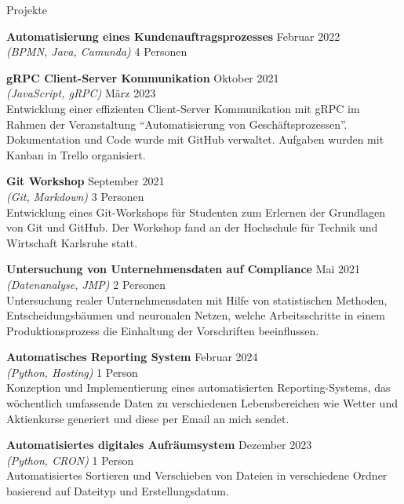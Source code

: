 \documentclass{resume} %
\begin{document}
\begin{rSection}{Projekte}
    \item \textbf{Automatisierung eines Kundenauftragsprozesses} \hfill {Februar 2022} \\
    \textit{(BPMN, Java, Camunda)} \hfill {4 Personen}\\

    \item \textbf{gRPC Client-Server Kommunikation} \hfill {Oktober 2021} \\
    \textit{(JavaScript, gRPC)} \hfill {März 2023}\\
    {Entwicklung einer effizienten Client-Server Kommunikation mit gRPC im Rahmen der Veranstaltung “Automatisierung von Geschäftsprozessen”.
    Dokumentation und Code wurde mit GitHub verwaltet. Aufgaben wurden mit Kanban in Trello organisiert.}
    
    \item \textbf{Git Workshop} \hfill {September 2021} \\
    \textit{(Git, Markdown)} \hfill {3 Personen}\\
    {Entwicklung eines Git-Workshops für Studenten zum Erlernen der Grundlagen von Git und GitHub.
    Der Workshop fand an der Hochschule für Technik und Wirtschaft Karlsruhe statt.}

    \item \textbf{Untersuchung von Unternehmensdaten auf Compliance} \hfill {Mai 2021} \\
    \textit{(Datenanalyse, JMP)} \hfill {2 Personen} \\
    {Untersuchung realer Unternehmensdaten mit Hilfe von statistischen Methoden, Entscheidungsbäumen und neuronalen Netzen,
    welche Arbeitsschritte in einem Produktionsprozess die Einhaltung der Vorschriften beeinflussen.}

    \item \textbf{Automatisches Reporting System} \hfill {Februar 2024} \\
    \textit{(Python, Hosting)} \hfill {1 Person}\\
    {Konzeption und Implementierung eines automatisierten Reporting-Systems, das wöchentlich umfassende Daten zu verschiedenen Lebensbereichen wie Wetter und Aktienkurse generiert und diese per Email an mich sendet.}
    
    \item \textbf{Automatisiertes digitales Aufräumsystem} \hfill {Dezember 2023}\\ 
    \textit{(Python, CRON)} \hfill {1 Person}\\
    {Automatisiertes Sortieren und Verschieben von Dateien in verschiedene Ordner basierend auf Dateityp und Erstellungsdatum.}
    

\end{rSection}
\end{document}
